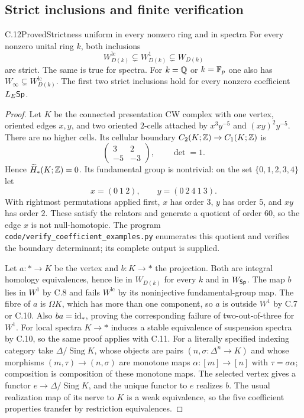 \subsection{Strict inclusions and finite verification}
\begin{claim}{C.12}{Proved}{Strictness uniform in every nonzero ring and in spectra}
For every nonzero unital ring $k$, both inclusions
\[
 W_{D(k)}^{\mathrm{lc}}\subsetneq W_{D(k)}^1\subsetneq W_{D(k)}
\]
are strict.  The same is true for spectra.  For $k=\mathbb Q$ or $k=\mathbb F_p$ one also has $W_\infty\subsetneq W_{D(k)}^{\mathrm{lc}}$.  The first two strict inclusions hold for every nonzero coefficient $L_E\mathsf{Sp}$.
\end{claim}
\begin{proof}
Let $K$ be the connected presentation CW complex with one vertex, oriented edges $x,y$, and two oriented $2$-cells attached by $x^3y^{-5}$ and $(xy)^2y^{-5}$.  There are no higher cells.  Its cellular boundary $C_2(K;\mathbb Z)\to C_1(K;\mathbb Z)$ is
\[
 \begin{pmatrix}3&2\\-5&-3\end{pmatrix},\qquad \det=1.
\]
Hence $\widetilde H_*(K;\mathbb Z)=0$.  Its fundamental group is nontrivial: on the set $\{0,1,2,3,4\}$ let
\[
 x=(0\ 1\ 2),\qquad y=(0\ 2\ 4\ 1\ 3).
\]
With rightmost permutations applied first, $x$ has order $3$, $y$ has order $5$, and $xy$ has order $2$.  These satisfy the relators and generate a quotient of order $60$, so the edge $x$ is not null-homotopic.  The program \texttt{code/verify\_coefficient\_examples.py} enumerates this quotient and verifies the boundary determinant; its complete output is supplied.

Let $a:*\to K$ be the vertex and $b:K\to *$ the projection.  Both are integral homology equivalences, hence lie in $W_{D(k)}$ for every $k$ and in $W_{\mathsf{Sp}}$.  The map $b$ lies in $W^1$ by C.8 and fails $W^{\mathrm{lc}}$ by its noninjective fundamental-group map.  The fibre of $a$ is $\Omega K$, which has more than one component, so $a$ is outside $W^1$ by C.7 or C.10.  Also $ba=\mathrm{id}_*$, proving the corresponding failure of two-out-of-three for $W^1$.  For local spectra $K\to *$ induces a stable equivalence of suspension spectra by C.10, so the same proof applies with C.11.  For a literally specified indexing category take $\Delta/\operatorname{Sing}K$, whose objects are pairs $(n,\sigma:\Delta^n\to K)$ and whose morphisms $(m,\tau)\to(n,\sigma)$ are monotone maps $\alpha:[m]\to[n]$ with $\tau=\sigma\alpha$; composition is composition of these monotone maps.  The selected vertex gives a functor $e\to\Delta/\operatorname{Sing}K$, and the unique functor to $e$ realizes $b$.  The usual realization map of its nerve to $K$ is a weak equivalence, so the five coefficient properties transfer by restriction equivalences.


\end{proof}
